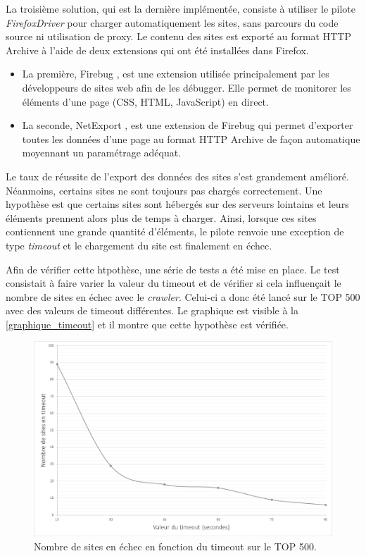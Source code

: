 La troisième solution, qui est la dernière implémentée, consiste à utiliser le pilote \textit{FirefoxDriver} pour charger automatiquement les sites, sans parcours du code source ni utilisation de proxy. Le contenu des sites est exporté au format HTTP Archive à l'aide de deux extensions qui ont été installées dans Firefox.
\begin{itemize}
	\item La première, Firebug \cite{firebug_homepage}, est une extension utilisée principalement par les développeurs de sites web afin de les débugger. Elle permet de monitorer les éléments d'une page (CSS, HTML, JavaScript) en direct.
	\item La seconde, NetExport \cite{netexport_homepage}, est une extension de Firebug qui permet d'exporter toutes les données d'une page au format HTTP Archive de façon automatique moyennant un paramétrage adéquat.
\end{itemize}

Le taux de réussite de l'export des données des sites s'est grandement amélioré. Néanmoins, certains sites ne sont toujours pas chargés correctement.
Une hypothèse est que certains sites sont hébergés sur des serveurs lointains et leurs éléments prennent alors plus de temps à charger. Ainsi, lorsque ces sites contiennent une grande quantité d'éléments, le pilote renvoie une exception de type \textit{timeout} et le chargement du site est finalement en échec.

Afin de vérifier cette htpothèse, une série de tests a été mise en place. Le test consistait à faire varier la valeur du timeout et de vérifier si cela influençait le nombre de sites en échec avec le \textit{crawler}. Celui-ci a donc été lancé sur le TOP 500 avec des valeurs de timeout différentes.
Le graphique est visible à la \autoref{graphique_timeout} et il montre que cette hypothèse est vérifiée.
\newline

\begin{figure}[!h]
	\centering
	\includegraphics[scale=.6]{timeouts/Timeouts_NB.png}
	\caption{\label{graphique_timeout}Nombre de sites en échec en fonction du timeout sur le TOP 500.}
\end{figure}

